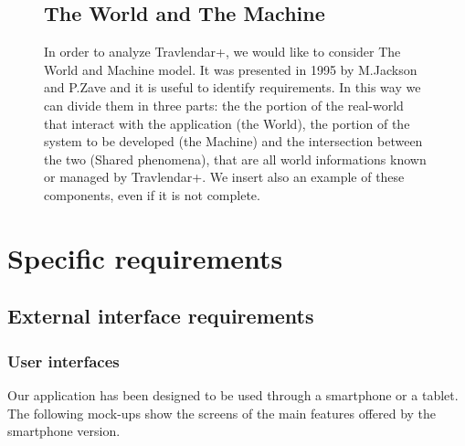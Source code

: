 \documentclass[12pt,titlepage]{article}
\begin{document}
\begin{figure}
\subsection{The World and The Machine}\label{sec:mod1}
In order to analyze Travlendar+, we would like to consider The World and Machine model. It was presented in 1995 by M.Jackson and P.Zave and it is useful to identify requirements. In this way we can divide them in three parts: the the portion of the real-world that interact with the application (the World), the portion of the system to be developed (the Machine) and the intersection between the two (Shared phenomena), that are all world informations known or managed by Travlendar+.
We insert also an example of these components, even if it is not complete.
\centering
{}
\end{figure}

\pagebreak
\section{Specific requirements}\label{sec:crit}

\subsection{External interface requirements}\label{sec:mod1}
\subsubsection{User interfaces}\label{sec:mod1}
Our application has been designed to be used through a smartphone or a tablet.
The following mock-ups show the screens of the main features offered by the smartphone version. 
\end{document}

